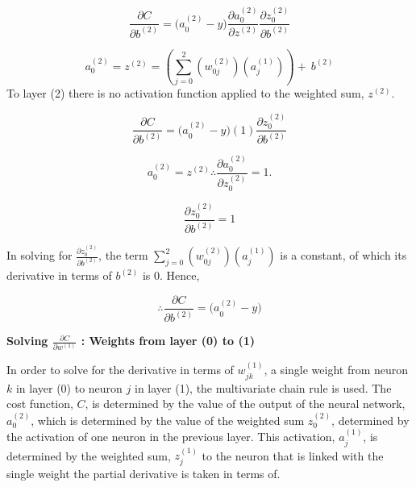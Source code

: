 \documentclass[12pt,a4paper]{article}
\begin{document}
	
\begin{equation}
\frac{\partial C}{\partial b^{\left(2\right)}}={(a}_0^{\left(2\right)}-y)\frac{\partial  a_0^{\left(2\right)}}{\partial z^{\left(2\right)}}\frac{\partial z_0^{\left(2\right)}}{\partial b^{\left(2\right)}}	
\end{equation}


\begin{equation}
a_0^{\left(2\right)}=z^{\left(2\right)}=\left(\sum_{j=0}^{2}\left(w_{0j}^{\left(2\right)}\right)\left(a_j^{\left(1\right)}\right)\right)+\ b^{\left(2\right)}	
\end{equation} 
To layer (2) there is no activation function applied to the weighted sum, $z^{(2)}$. 




\begin{equation}
\frac{\partial C}{\partial b^{\left(2\right)}}={(a}_0^{\left(2\right)}-y)(1)\frac{\partial z_0^{\left(2\right)}}{\partial b^{\left(2\right)}}
\end{equation} 

\begin{equation}
	a_0^{\left(2\right)}= z^{\left(2\right)} \therefore \frac{\partial a_0^{(2)}}{\partial z_0^{\left(2\right)}} = 1.
\end{equation} 

\begin{equation}
\frac{\partial z_0^{\left(2\right)}}{\partial b^{\left(2\right)}}=1
\end{equation} 	

In solving for $\frac{\partial z_0^{\left(2\right)}}{\partial b^{\left(2\right)}}$, the term $\sum_{j=0}^{2}\left(w_{0j}^{\left(2\right)}\right)\left(a_j^{\left(1\right)}\right)$ is a constant, of which its derivative in terms of $b^{(2)}$ is 0. Hence,

\begin{equation}
\boxed{\therefore\frac{\partial C}{\partial b^{\left(2\right)}}={(a}_0^{\left(2\right)}-y)}
\end{equation}


\textbf{Solving $\frac{\partial C}{\partial w^{\left(1\right)}}$ : Weights from layer (0) to (1)}

In order to solve for the derivative in terms of $w_{jk}^{\left(1\right)}$, a single weight from neuron $k$ in layer (0) to neuron $j$ in layer (1), the multivariate chain rule is used. The cost function, $C$, is determined by the value of the output of the neural network, $a_0^{(2)}$, which is determined by the value of the weighted sum $z_0^{\left(2\right)}$, determined by the activation of one neuron in the previous layer. This activation, $a_j^{\left(1\right)}$, is determined by the weighted sum, $z_j^{\left(1\right)}$ to the neuron that is linked with the single weight the partial derivative is taken in terms of.
\end{document}

